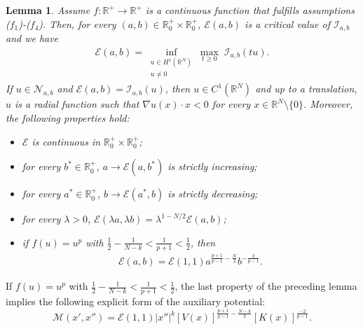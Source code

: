 \documentclass[a4paper]{amsart}
\newtheorem{lemma}[proposition]{Lemma}
\begin{document}
\begin{lemma}
 Assume $f : {\mathbb{R}}^+ \rightarrow {\mathbb{R}}^+$ is a continuous function that fulfills assumptions ($f_1$)-($f_4$). Then, for every
$(a,b) \in {\mathbb{R}}^+_0 \times {\mathbb{R}}^+_0$, $\mathcal{E}(a,b)$ is a critical value of $\mathcal{I}_{a,b}$ and we have
\begin{align*}
 \mathcal{E}(a,b) = \inf_{\substack{u \in H^1({\mathbb{R}}^N) \\ u \neq 0}} \max_{t \geq 0} \; \mathcal{I}_{a,b}(tu).
\end{align*}
If $u \in \mathcal{N}_{a,b}$ and $\mathcal{E}(a,b) = \mathcal{I}_{a,b}(u)$, then $u \in C^1({\mathbb{R}}^N)$ and up to a
translation, $u$ is a radial function such that $\nabla u(x) \cdot x < 0$ for every $x \in {\mathbb{R}}^N\setminus \{0\}$.
Moreover, the following properties hold:
\begin{itemize}
 \item[(i)] $\mathcal{E}$ is continuous in ${\mathbb{R}}^+_0 \times {\mathbb{R}}^+_0$;
 \item[(ii)] for every $b^* \in {\mathbb{R}}^+_0$, $a \to \mathcal{E}(a,b^*)$ is strictly increasing;
 \item[(iii)] for every $a^* \in {\mathbb{R}}^+_0$, $b \to \mathcal{E}(a^*,b)$ is strictly decreasing;
 \item[(iv)] for every $\lambda > 0$, $\mathcal{E}(\lambda a, \lambda b) = \lambda^{1-N/2} \mathcal{E}(a,b)$;
 \item[(v)] if $f(u) = u^p$ with $\frac{1}{2} - \frac{1}{N-k} < \frac{1}{p+1} < \frac{1}{2}$, then
\begin{align*}
 \mathcal{E}(a,b) = \mathcal{E}(1,1) a^{\frac{p+1}{p-1}-\frac{N}{2}} b^{-\frac{2}{p-1}}.
\end{align*}
\end{itemize}
\end{lemma}

If $f(u) = u^p$ with $\frac{1}{2} - \frac{1}{N-k} < \frac{1}{p+1} < \frac{1}{2}$, the last property of the preceding
lemma implies the following explicit form of the auxiliary potential:
\[
\label{defM2}
 \mathcal{M}(x',x'') = \mathcal{E}(1,1) {\left| {x''} \right|}^k \left[V(x)\right]^{\frac{p+1}{p-1} - \frac{N-k}{2}}
\left[K(x)\right]^{\frac{-2}{p-1}}.
\]
\end{document}

